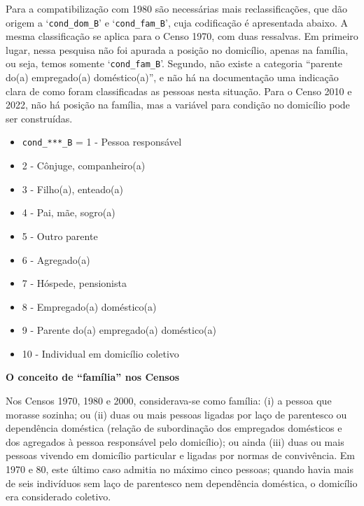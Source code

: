 \documentclass[12pt,a4paper]{article}
\newcommand{\vr}[1]{\texttt{#1}}
\begin{document}
Para a compatibilização com 1980 são necessárias mais reclassificações, que dão origem a ‘\vr{cond\_dom\_B}’ e ‘\vr{cond\_fam\_B}’, cuja codificação é apresentada abaixo. A mesma classificação se aplica para o Censo 1970, com duas ressalvas. Em primeiro lugar, nessa pesquisa não foi apurada a posição no domicílio, apenas na família, ou seja, temos somente ‘\vr{cond\_fam\_B}’. Segundo, não existe a categoria “parente do(a) empregado(a) doméstico(a)”, e não há na documentação uma indicação clara de como foram classificadas as pessoas nesta situação. Para o Censo 2010 e 2022, não há posição na família, mas a variável para condição no domicílio pode ser construídas.
\begin{itemize}
  \item \vr{cond\_***\_B} = 1 - Pessoa responsável
  \item 2 - Cônjuge, companheiro(a)
  \item 3 - Filho(a), enteado(a)
  \item 4 - Pai, mãe, sogro(a)
  \item 5 - Outro parente
  \item 6 - Agregado(a)
  \item 7 - Hóspede, pensionista
  \item 8 - Empregado(a) doméstico(a)
  \item 9 - Parente do(a) empregado(a) doméstico(a)
  \item 10 - Individual em domicílio coletivo
\end{itemize}

\textbf{O conceito de “família” nos Censos}

Nos Censos 1970, 1980 e 2000, considerava-se como família: (i) a pessoa que morasse sozinha; ou (ii) duas ou mais pessoas ligadas por laço de parentesco ou dependência doméstica (relação de subordinação dos empregados domésticos e dos agregados à pessoa responsável pelo domicílio); ou ainda (iii) duas ou mais pessoas vivendo em domicílio particular e ligadas por normas de convivência. Em 1970 e 80, este último caso admitia no máximo cinco pessoas; quando havia mais de seis indivíduos sem laço de parentesco nem dependência doméstica, o domicílio era considerado coletivo.
\end{document}
